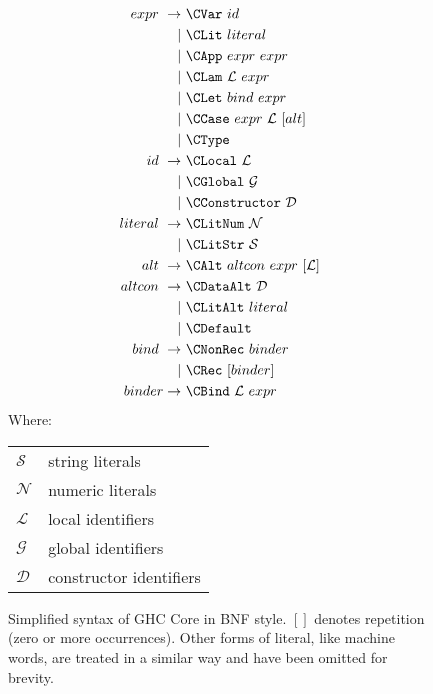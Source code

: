 \begin{figure}
  \begin{equation*}
    \begin{split}
      expr\    \rightarrow\ & \CVar\ id                          \\
                         |\ & \CLit\ literal                     \\
                         |\ & \CApp\ expr\ expr                  \\
                         |\ & \CLam\ \mathcal{L}\ expr           \\
                         |\ & \CLet\ bind\ expr                  \\
                         |\ & \CCase\ expr\ \mathcal{L}\ [alt]   \\
                         |\ & \CType                             \\
      id\      \rightarrow\ & \CLocal\       \mathcal{L}         \\
                         |\ & \CGlobal\      \mathcal{G}         \\
                         |\ & \CConstructor\ \mathcal{D}         \\
      literal\ \rightarrow\ & \CLitNum\ \mathcal{N}              \\
                         |\ & \CLitStr\ \mathcal{S}              \\
      alt\     \rightarrow\ & \CAlt\ altcon\ expr\ [\mathcal{L}] \\
      altcon\  \rightarrow\ & \CDataAlt\ \mathcal{D}             \\
                         |\ & \CLitAlt\ literal                  \\
                         |\ & \CDefault                          \\
      bind\    \rightarrow\ & \CNonRec\ binder                   \\
                         |\ & \CRec\ [binder]                    \\
      binder   \rightarrow\ & \CBind\ \mathcal{L}\ expr
    \end{split}
  \end{equation*}
  Where:
  \begin{tabular}[t]{l @{ $=$ } l}
    $\mathcal{S}$ & string literals    \\
    $\mathcal{N}$ & numeric literals   \\
    $\mathcal{L}$ & local identifiers  \\
    $\mathcal{G}$ & global identifiers \\
    $\mathcal{D}$ & constructor identifiers
  \end{tabular}

  \caption{Simplified syntax of GHC Core in BNF style. $[]$ denotes repetition
    (zero or more occurrences). Other forms of literal, like machine words, are
    treated in a similar way and have been omitted for brevity.}
  \label{fig:coresyntax}
\end{figure}

